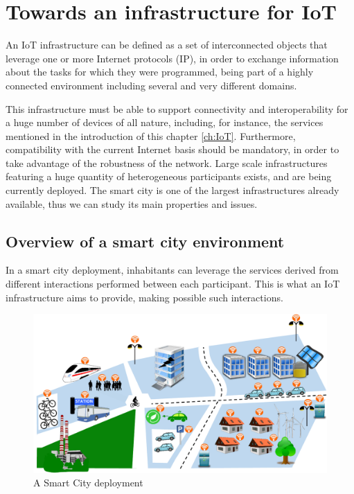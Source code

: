 \section{Towards an infrastructure for IoT}
\label{sec:IoTInfra}
An IoT infrastructure can be defined as a set of interconnected objects that leverage one or more Internet protocols (IP), in order to exchange information about the tasks for which they were programmed, being part of a highly connected environment including several and very different domains.

This infrastructure must be able to support connectivity and interoperability for a huge number of devices of all nature, including, for instance, the services mentioned in the introduction of this chapter \ref{ch:IoT}.
Furthermore, compatibility with the current Internet basis should be mandatory, in order to take advantage of the robustness of the network.
Large scale infrastructures featuring a huge quantity of heterogeneous participants exists, and are being currently deployed.
The smart city is one of the largest infrastructures already available, thus we can study its main properties and issues.



\subsection{Overview of a smart city environment}
\label{sec:SmartCityEnv}
In a smart city deployment\cite{smartsantander}, inhabitants can leverage the services derived from different interactions performed between each participant.
This is what an IoT infrastructure aims to provide, making possible such interactions.

\begin{figure}[htb]
	\centering
	\includegraphics[width=1\columnwidth]{chapters/background.images/SmartCity_comm.pdf}
	\caption{A Smart City deployment}
	\label{fig:SmartCity}
\end{figure}

